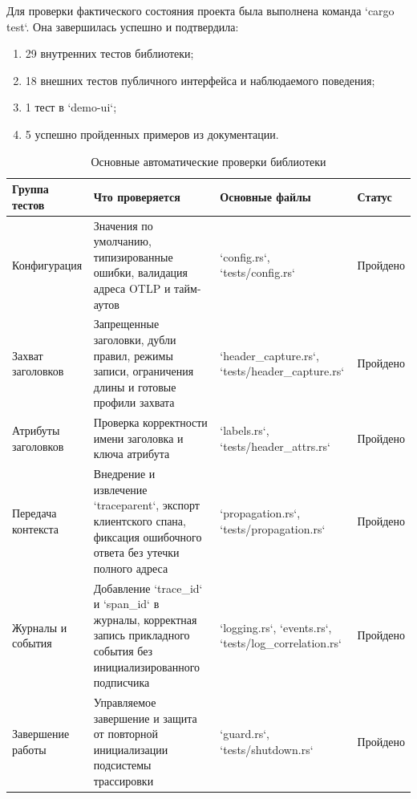 Для проверки фактического состояния проекта была выполнена команда
`cargo test`. Она завершилась успешно и подтвердила:
\begin{enumerate}
    \item 29 внутренних тестов библиотеки;
    \item 18 внешних тестов публичного интерфейса и наблюдаемого поведения;
    \item 1 тест в `demo-ui`;
    \item 5 успешно пройденных примеров из документации.
\end{enumerate}

\begin{table}[H]
    \centering
    \caption{Основные автоматические проверки библиотеки}
    \label{tab:tests-summary}
    \renewcommand{\arraystretch}{1.2}
    \begin{tabularx}{\textwidth}{>{\raggedright\arraybackslash}p{3.0cm} >{\raggedright\arraybackslash}X >{\raggedright\arraybackslash}p{2.5cm} >{\raggedright\arraybackslash}p{1.8cm}}
        \toprule
        Группа тестов & Что проверяется & Основные файлы & Статус \\
        \midrule
        Конфигурация & Значения по умолчанию, типизированные ошибки, валидация адреса OTLP и тайм-аутов & `config.rs`, `tests/config.rs` & Пройдено \\
        \addlinespace
        Захват заголовков & Запрещенные заголовки, дубли правил, режимы записи, ограничения длины и готовые профили захвата & `header_capture.rs`, `tests/header_capture.rs` & Пройдено \\
        \addlinespace
        Атрибуты заголовков & Проверка корректности имени заголовка и ключа атрибута & `labels.rs`, `tests/header_attrs.rs` & Пройдено \\
        \addlinespace
        Передача контекста & Внедрение и извлечение `traceparent`, экспорт клиентского спана, фиксация ошибочного ответа без утечки полного адреса & `propagation.rs`, `tests/propagation.rs` & Пройдено \\
        \addlinespace
        Журналы и события & Добавление `trace_id` и `span_id` в журналы, корректная запись прикладного события без инициализированного подписчика & `logging.rs`, `events.rs`, `tests/log_correlation.rs` & Пройдено \\
        \addlinespace
        Завершение работы & Управляемое завершение и защита от повторной инициализации подсистемы трассировки & `guard.rs`, `tests/shutdown.rs` & Пройдено \\
        \bottomrule
    \end{tabularx}
\end{table}

